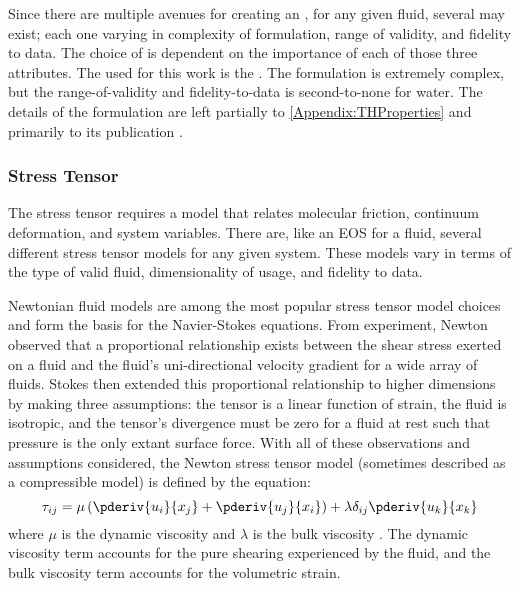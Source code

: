 Since there are multiple avenues for creating an , for any given fluid, several may exist; each one varying in complexity of formulation, range of validity, and fidelity to data.
The choice of  is dependent on the importance of each of those three attributes.
The  used for this work is the .
The  formulation is extremely complex, but the range-of-validity and fidelity-to-data is second-to-none for water.
The details of the formulation are left partially to \cref{Appendix:THProperties} and primarily to its publication \cite{iapws_revised_2009}.



\subsubsection{Stress Tensor}\label{SubSubSection:StressTensor}
The stress tensor requires a model that relates molecular friction, continuum deformation, and system variables.
There are, like an EOS for a fluid, several different stress tensor models for any given system.
These models vary in terms of the type of valid fluid, dimensionality of usage, and fidelity to data.

Newtonian fluid models are among the most popular stress tensor model choices and form the basis for the Navier-Stokes equations.
From experiment, Newton observed that a proportional relationship exists between the shear stress exerted on a fluid and the fluid's uni-directional velocity gradient for a wide array of fluids.
Stokes then extended this proportional relationship to higher dimensions by making three assumptions: the tensor is a linear function of strain, the fluid is isotropic, and the tensor's divergence must be zero for a fluid at rest such that pressure is the only extant surface force.
With all of these observations and assumptions considered, the Newton stress tensor model (sometimes described as a compressible model) is defined by the equation:
\begin{equation}
    \tau_{ij} = \mu \left(\pderiv{u_i}{x_j} + \pderiv{u_j}{x_i}\right) + \lambda \delta_{ij} \pderiv{u_k}{x_k}
\end{equation}
where $\mu$ is the dynamic viscosity and $\lambda$ is the bulk viscosity \cite{johnson_handbook_1998-2}.
The dynamic viscosity term accounts for the pure shearing experienced by the fluid, and the bulk viscosity term accounts for the volumetric strain.

